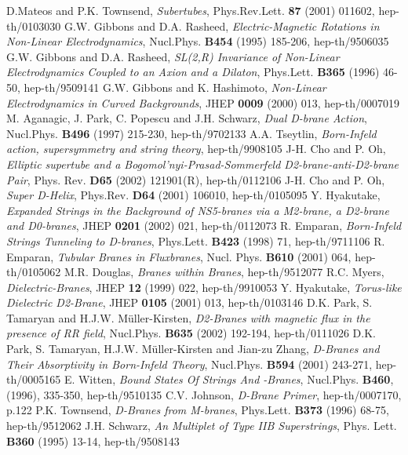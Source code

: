 \documentclass[a4paper,12pt]{article}
\begin{document}
\begin{thebibliography}{99}

D.Mateos and P.K. Townsend, {\it Subertubes}, Phys.Rev.Lett. 
{\bf 87} (2001) 011602, hep-th/0103030
G.W. Gibbons and D.A. Rasheed, {\it Electric-Magnetic Rotations 
in Non-Linear Electrodynamics}, Nucl.Phys. {\bf B454} 
(1995) 185-206, hep-th/9506035
G.W. Gibbons and D.A. Rasheed, {\it SL(2,R) Invariance of 
Non-Linear Electrodynamics Coupled to an Axion and a Dilaton}, Phys.Lett. 
{\bf B365} (1996) 46-50, hep-th/9509141 
G.W. Gibbons and K. Hashimoto, {\it Non-Linear Electrodynamics in Curved Backgrounds}, JHEP {\bf 0009} (2000) 013, hep-th/0007019
M. Aganagic, J. Park, C. Popescu and J.H. Schwarz, {\it Dual 
D-brane Action}, Nucl.Phys. {\bf B496} (1997) 215-230, hep-th/9702133
A.A. Tseytlin, {\it Born-Infeld action, supersymmetry and string 
theory}, hep-th/9908105
J-H. Cho and P. Oh, {\it Elliptic supertube and a Bogomol'nyi-Prasad-Sommerfeld D2-brane-anti-D2-brane Pair}, Phys. Rev. {\bf D65} (2002) 121901(R), hep-th/0112106
J-H. Cho and P. Oh, {\it Super D-Helix}, Phys.Rev. {\bf D64} 
(2001) 106010, hep-th/0105095
Y. Hyakutake, {\it Expanded Strings in the Background of 
NS5-branes via a M2-brane, a D2-brane and D0-branes}, JHEP {\bf 0201} (2002) 
021, hep-th/0112073
R. Emparan, {\it Born-Infeld Strings Tunneling to D-branes}, 
Phys.Lett. {\bf B423} (1998) 71, hep-th/9711106
R. Emparan, {\it Tubular Branes in Fluxbranes}, Nucl. Phys. {\bf B610} (2001) 064, hep-th/0105062 
M.R. Douglas, {\it Branes within Branes}, hep-th/9512077
R.C. Myers, {\it Dielectric-Branes}, JHEP {\bf 12} (1999) 022, 
hep-th/9910053
Y. Hyakutake, {\it Torus-like Dielectric D2-Brane}, JHEP {\bf 0105} (2001) 013, hep-th/0103146
D.K. Park, S. Tamaryan and H.J.W. M\"uller-Kirsten, {\it D2-Branes 
with magnetic flux in the presence of RR field}, Nucl.Phys. {\bf B635} (2002) 
192-194, hep-th/0111026
D.K. Park, S. Tamaryan, H.J.W. M\"uller-Kirsten and Jian-zu Zhang, 
{\it D-Branes and Their Absorptivity in Born-Infeld Theory}, Nucl.Phys. 
{\bf B594} (2001) 243-271, hep-th/0005165
E. Witten, {\it Bound States Of Strings And \coordHE{}-Branes}, 
Nucl.Phys. {\bf B460}, (1996), 335-350, hep-th/9510135
C.V. Johnson, {\it D-Brane Primer}, hep-th/0007170, p.122
P.K. Townsend, {\it D-Branes from M-branes}, Phys.Lett. {\bf B373} 
(1996) 68-75, hep-th/9512062
J.H. Schwarz, {\it An \coordHE{} Multiplet of Type IIB Superstrings}, Phys. Lett. {\bf B360} (1995) 13-14, hep-th/9508143
\end{thebibliography}
\end{document}
